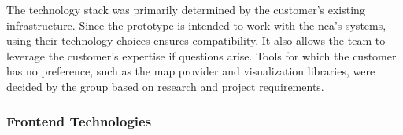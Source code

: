 The technology stack was primarily determined by the customer's existing infrastructure. Since the prototype is intended to work with the \acrshort{nca}'s systems, using their technology choices ensures compatibility. It also allows the team to leverage the customer's expertise if questions arise. Tools for which the customer has no preference, such as the map provider and visualization libraries, were decided by the group based on research and project requirements. 

\subsubsection{Frontend Technologies}
